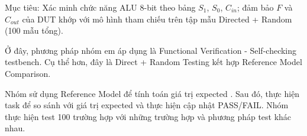 







Mục tiêu: Xác minh chức năng ALU 8-bit theo bảng $S_{1}$, $S_{0}$, $C_{in}$; đảm bảo $F$ và $C_{out}$ của DUT khớp với mô hình tham chiếu trên tập mẫu Directed + Random (100 mẫu tổng).

Ở đây, phương pháp nhóm em áp dụng là Functional Verification - Self-checking testbench. Cụ thể hơn, đây là Direct + Random Testing kết hợp Reference Model Comparison.

Nhóm sử dụng Reference Model để tính toán giá trị expected . Sau đó, thực hiện task để so sánh với giá trị expected và thực hiện cập nhật \textsf{PASS}/\textsf{FAIL}. Nhóm thực hiện test 100 trường hợp với những trường hợp và phương pháp test khác nhau.

